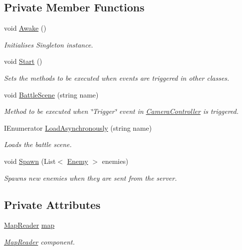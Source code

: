 \subsection*{Private Member Functions}
\begin{DoxyCompactItemize}
\item 
void \mbox{\hyperlink{class_enemy_manager_a9a95e72112a8e624588bb8283d66698e}{Awake}} ()
\begin{DoxyCompactList}\small\item\em Initialises Singleton instance. \end{DoxyCompactList}\item 
void \mbox{\hyperlink{class_enemy_manager_afcf3de6b6a3f197fe343fc43592b46d5}{Start}} ()
\begin{DoxyCompactList}\small\item\em Sets the methods to be executed when events are triggered in other classes. \end{DoxyCompactList}\item 
void \mbox{\hyperlink{class_enemy_manager_a5071674c83c4cf81fe90dd2655713828}{Battle\+Scene}} (string name)
\begin{DoxyCompactList}\small\item\em Method to be executed when \char`\"{}\+Trigger\char`\"{} event in \mbox{\hyperlink{class_camera_controller}{Camera\+Controller}} is triggered. \end{DoxyCompactList}\item 
I\+Enumerator \mbox{\hyperlink{class_enemy_manager_aa24657bcb9c290a4f21c5e861f8f60e1}{Load\+Asynchronously}} (string name)
\begin{DoxyCompactList}\small\item\em Loads the battle scene. \end{DoxyCompactList}\item 
void \mbox{\hyperlink{class_enemy_manager_a0c3680c45bec759982150be5c613dd88}{Spawn}} (List$<$ \mbox{\hyperlink{class_enemy}{Enemy}} $>$ enemies)
\begin{DoxyCompactList}\small\item\em Spawns new enemies when they are sent from the server. \end{DoxyCompactList}\end{DoxyCompactItemize}
\subsection*{Private Attributes}
\begin{DoxyCompactItemize}
\item 
\mbox{\hyperlink{class_map_reader}{Map\+Reader}} \mbox{\hyperlink{class_enemy_manager_acb5c779b01cdfa40fddf6d2377dab3c5}{map}}
\begin{DoxyCompactList}\small\item\em \mbox{\hyperlink{class_map_reader}{Map\+Reader}} component. \end{DoxyCompactList}\end{DoxyCompactItemize}


